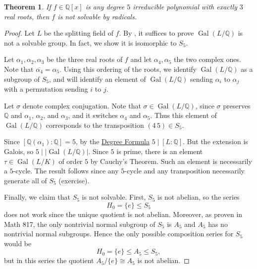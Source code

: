 \documentclass[12pt]{report}
\newtheorem{theorem}{Theorem}[chapter]
\numberwithin{equation}{section}
\numberwithin{theorem}{chapter}
\theoremstyle{definition}
\newtheorem*{basic properties}{Basic Properties}
\newtheorem*{Important Remark}{Important Remark}
\DeclareMathOperator{\Gal}{Gal}
\begin{document}
\begin{theorem}\label{deg 5 not solvable}
If $f \in \mathbb{Q}[x]$ is any degree $5$ irreducible polynomial with exactly $3$ real roots, then $f$ is not solvable by radicals.
\end{theorem}

\begin{proof} 
Let $L$ be the splitting field of $f$. By , it suffices to prove $\Gal(L/\mathbb{Q})$ is not a solvable group. In fact, we show it is isomorphic to $S_5$.

Let $\alpha_1, \alpha_2, \alpha_3$ be the three real roots of $f$ and let $\alpha_4, \alpha_5$ the two complex ones.
Note that $\overline{\alpha_4} = \alpha_5$.  Using this ordering of the roots, we identify $\Gal(L/\mathbb{Q})$ as a subgroup of $S_5$, and will identify an element of $\Gal(L/\mathbb{Q})$ sending $\alpha_i$ to $\alpha_j$ with a permutation sending $i$ to $j$.

Let $\sigma$ denote complex conjugation. Note that $\sigma \in \Gal(L/\mathbb{Q})$, since $\sigma$ preserves $\mathbb{Q}$ and $\alpha_1$, $\alpha_2$, and $\alpha_3$, and it switches $\alpha_4$ and $\alpha_5$. Thus this element of $\Gal(L/\mathbb{Q})$ corresponds to the transposition $(4 \, 5) \in S_5$.


Since $[\mathbb{Q}(\alpha_1): \mathbb{Q}] = 5$, by the \hyperref[deg formula]{Degree Formula} $5 \mid [L : \mathbb{Q}]$. But the extension is Galois, so $5 \mid |\Gal(L/\mathbb{Q})|$. Since $5$ is prime, there is an element $\tau \in \Gal(L/K)$ of order $5$ by Cauchy's Theorem. Such an element is necessarily a $5$-cycle. The result follows since any $5$-cycle and any transposition necessarily generate all of $S_5$ (exercise).

Finally, we claim that $S_5$ is not solvable. First, $S_5$ is not abelian, so the series 
$$H_0=\{e\}\leq S_5$$
does not work since the unique quotient is not abelian. 
Moreover, as proven in Math 817, the only nontrivial normal subgroup of $S_5$ is $A_5$ and $A_5$ has no nontrivial normal subgroups. Hence the only possible composition series for $S_5$ would be 
$$H_0=\{e\}\leq A_5\leq S_5,$$ 
but in this series the quotient $A_5/\{e\}\cong A_5$ is not abelian.
\end{proof}
\end{document}
